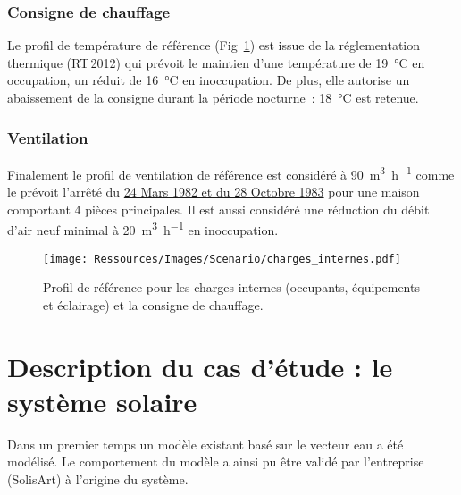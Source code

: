 \subsubsection{Consigne de chauffage} %
\label{ssub:consigne_de_chauffage}
Le profil de température de référence (Fig~\ref{fig:scenario_reference}) est issue de la
réglementation thermique (RT\,2012) qui prévoit le maintien d’une température de
\SI{19}{\celsius} en occupation, un réduit de \SI{16}{\celsius} en inoccupation. De plus,
elle autorise un abaissement de la consigne durant la période nocturne~: \SI{18}{\celsius} est
retenue.

\subsubsection{Ventilation} %
\label{ssub:ventilation_ref}
Finalement le profil de ventilation de référence est considéré à \SI[per-mode=symbol]{90}{\meter\cubed\per\hour}
comme le prévoit l’arrêté du \href{https://www.legifrance.gouv.fr/affichTexte.do?cidTexte=JORFTEXT000000862344}{24 Mars
1982 et du 28 Octobre 1983} pour une maison comportant 4 pièces principales. Il est aussi
considéré une réduction du débit d’air neuf minimal à \SI[per-mode=symbol]{20}{\meter\cubed\per\hour}
en inoccupation.

\begin{figure}
    \begin{center}
        \texttt{[image: Ressources/Images/Scenario/charges\_internes.pdf]}
    \end{center}
    \caption{Profil de référence pour les charges internes (occupants, équipements et éclairage)
             et la consigne de chauffage.
             \label{fig:scenario_reference}}
\end{figure}




\section{Description du cas d’étude : le système solaire} %
\label{sec:description_du_cas_d_etude_le_systeme_solaire}
Dans un premier temps un modèle existant basé sur le vecteur eau a été modélisé.
Le comportement du modèle a ainsi pu être validé par l’entreprise (SolisArt) à
l’origine du système.

